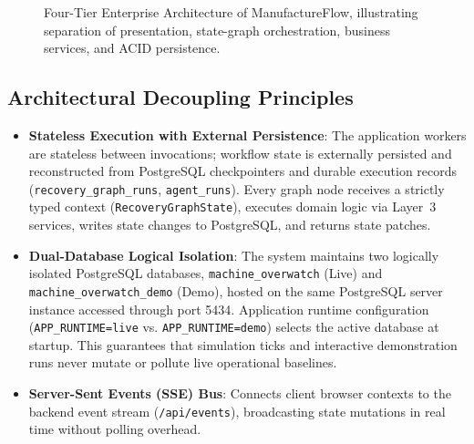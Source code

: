 \documentclass[10pt,twocolumn,a4paper]{article}
\begin{document}
\begin{figure}[t]
\caption{Four-Tier Enterprise Architecture of ManufactureFlow, illustrating separation of presentation, state-graph orchestration, business services, and ACID persistence.\label{fig:system_architecture}}
\end{figure}

\subsection{Architectural Decoupling Principles}
\begin{itemize}
    \item \textbf{Stateless Execution with External Persistence}: The application workers are stateless between invocations; workflow state is externally persisted and reconstructed from PostgreSQL checkpointers and durable execution records (\texttt{recovery\_graph\_runs}, \texttt{agent\_runs}). Every graph node receives a strictly typed context (\texttt{RecoveryGraphState}), executes domain logic via Layer~3 services, writes state changes to PostgreSQL, and returns state patches.
    \item \textbf{Dual-Database Logical Isolation}: The system maintains two logically isolated PostgreSQL databases, \texttt{machine\_overwatch} (Live) and \texttt{machine\_overwatch\_demo} (Demo), hosted on the same PostgreSQL server instance accessed through port 5434. Application runtime configuration (\texttt{APP\_RUNTIME=live} vs. \texttt{APP\_RUNTIME=demo}) selects the active database at startup. This guarantees that simulation ticks and interactive demonstration runs never mutate or pollute live operational baselines.
    \item \textbf{Server-Sent Events (SSE) Bus}: Connects client browser contexts to the backend event stream (\texttt{/api/events}), broadcasting state mutations in real time without polling overhead.
\end{itemize}
\end{document}
